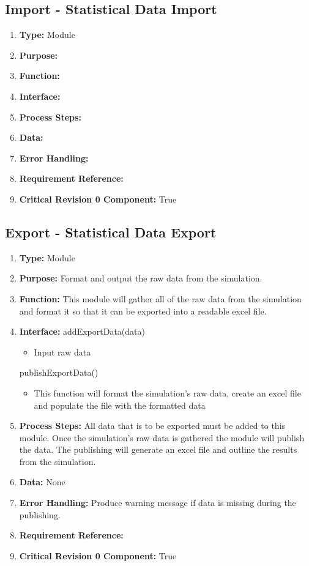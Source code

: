 \documentclass[paper=letter, fontsize=10pt]{scrartcl}
\numberwithin{equation}{section}		%
\numberwithin{figure}{section}			%
\numberwithin{table}{section}				%
\begin{document}
\subsection{Import - Statistical Data Import}
\begin{enumerate}[]
	\item \textbf{Type:} Module
	\item \textbf{Purpose:} 
	\item \textbf{Function:} 
	\item \textbf{Interface:}
	\item \textbf{Process Steps:} 
	\item \textbf{Data:}
	\item \textbf{Error Handling:}
	\item \textbf{Requirement Reference:}
	\item \textbf{Critical Revision 0 Component:} True
\end{enumerate}
\subsection{Export - Statistical Data Export}
\begin{enumerate}[]
	\item \textbf{Type:} Module
	\item \textbf{Purpose:} Format and output the raw data from the simulation.
	\item \textbf{Function:} This module will gather all of the raw data from the simulation and format it  so that it can be exported into a readable excel file.
	\item \textbf{Interface:}
	addExportData(data)
	\begin{itemize}
		\item Input raw data
	\end{itemize}
	publishExportData()
	\begin{itemize}
		\item This function will format the simulation's raw data, create an excel file and populate the file with the formatted data
	\end{itemize}
	\item \textbf{Process Steps:} All data that is to be exported must be added to this module.  Once the simulation's raw data is gathered the module will publish the data.  The publishing will generate an excel file and outline the results from the simulation.
	\item \textbf{Data:} None
	\item \textbf{Error Handling:}  Produce warning message if data is missing during the publishing.
	\item \textbf{Requirement Reference:}
	\item \textbf{Critical Revision 0 Component:} True
\end{enumerate}
\end{document}
